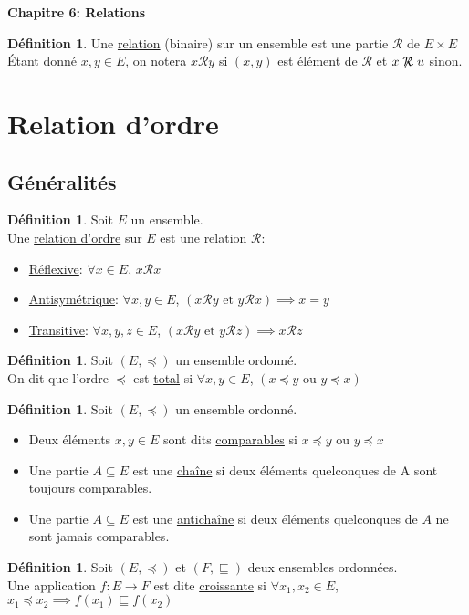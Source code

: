 \documentclass[10pt,a4paper]{article}
\theoremstyle{definition}
\newtheorem{definition}[proposition]{Définition}
\begin{document}
\renewcommand{\labelitemi}{$*$}
\begin{center}
{\Large \textbf{Chapitre 6: Relations}}
\end{center}

\begin{definition}
Une \uline{relation} (binaire) sur un ensemble est une partie $\mathrel{\mathcal{R}}$ de $E \times E$ \\
Étant donné $x, y \in E$, on notera $x \mathrel{\mathcal{R}} y$ si $(x, y)$ est élément de $\mathrel{\mathcal{R}}$ et $x \not\mathrel{\mathcal{R}} u$ sinon.
\end{definition}

\section{Relation d'ordre}
\subsection{Généralités}
\begin{definition}
Soit $E$ un ensemble. \\
Une \uline{relation d'ordre} sur $E$ est une relation $\mathrel{\mathcal{R}}$:
\begin{itemize}
\item  \uline{Réflexive}: $\forall x \in E$, $x \mathrel\mathcal{R} x$
\item \uline{Antisymétrique}: $\forall x, y \in E$, $(x \mathrel\mathcal{R} y \text{ et } y \mathrel\mathcal{R} x) \implies x = y$
\item \uline{Transitive}: $\forall x, y, z \in E$, $(x \mathrel\mathcal{R} y \text{ et } y \mathrel\mathcal{R} z) \implies x \mathrel\mathcal{R} z$
\end{itemize}
\end{definition}
\begin{definition}
Soit $(E, \preccurlyeq)$ un ensemble ordonné. \\
On dit que l'ordre $\preccurlyeq$ est \uline{total} si $\forall x, y \in E$, $(x \preccurlyeq y \text{ ou } y \preccurlyeq x)$
\end{definition}
\begin{definition}
Soit $(E, \preccurlyeq)$ un ensemble ordonné.
\begin{itemize}
\item Deux éléments $x, y \in E$ sont dits \uline{comparables} si $x \preccurlyeq y$ ou $y \preccurlyeq x$
\item Une partie $A \subseteq E$ est une \uline{chaîne} si deux éléments quelconques de A sont toujours comparables.
\item Une partie $A \subseteq E$ est une \uline{antichaîne} si deux éléments quelconques de $A$ ne sont jamais comparables.
\end{itemize}
\end{definition}
\begin{definition}
Soit $(E, \preccurlyeq)$ et $(F, \sqsubseteq)$ deux ensembles ordonnées. \\
Une application $f: E \to F$ est dite \uline{croissante} si $\forall x_1, x_2 \in E$, $x_1 \preccurlyeq x_2 \implies f(x_1) \sqsubseteq f(x_2)$
\end{definition}
\end{document}
